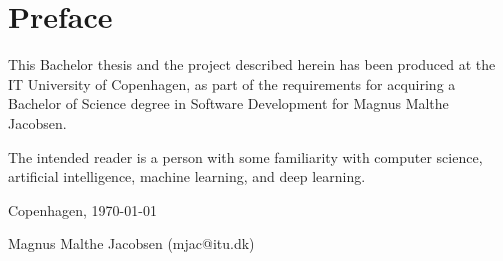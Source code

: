 \chapter{Preface}
This Bachelor thesis and the project described herein has been produced at the IT University of Copenhagen, as part of the requirements for acquiring a Bachelor of Science degree in Software Development for Magnus Malthe Jacobsen.

The intended reader is a person with some familiarity with computer science, artificial intelligence, machine learning, and deep learning.

\vfill
\begin{center}
	Copenhagen, \today
	\vspace{1cm}
	\begin{figure}[ht]
		\centering
	\end{figure}
\end{center}
\begin{flushright}
	Magnus Malthe Jacobsen (mjac@itu.dk)
\end{flushright}